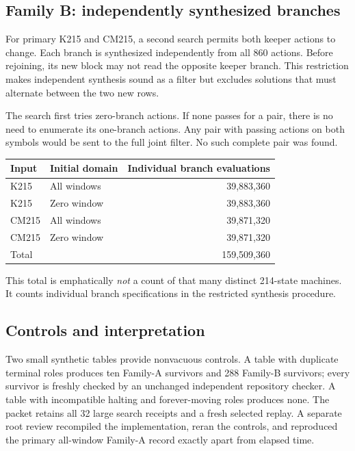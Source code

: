 \documentclass[11pt,letterpaper]{article}
\theoremstyle{definition}
\begin{document}
\subsection{Family B: independently synthesized branches}

For primary K215 and CM215, a second search permits both keeper actions
to change. Each branch is synthesized independently from all 860 actions.
Before rejoining, its new block may not read the opposite keeper branch.
This restriction makes independent synthesis sound as a filter but
excludes solutions that must alternate between the two new rows.

The search first tries zero-branch actions. If none passes for a pair,
there is no need to enumerate its one-branch actions. Any pair with
passing actions on both symbols would be sent to the full joint filter.
No such complete pair was found.

\begin{center}
\begin{tabular}{@{}llr@{}}
\toprule
Input & Initial domain & Individual branch evaluations\\
\midrule
K215 & All windows & 39,883,360\\
K215 & Zero window & 39,883,360\\
CM215 & All windows & 39,871,320\\
CM215 & Zero window & 39,871,320\\
\midrule
Total & & 159,509,360\\
\bottomrule
\end{tabular}
\end{center}

This total is emphatically \emph{not} a count of that many distinct
214-state machines. It counts individual branch specifications in the
restricted synthesis procedure.

\subsection{Controls and interpretation}

Two small synthetic tables provide nonvacuous controls. A table with
duplicate terminal roles produces ten Family-A survivors and 288
Family-B survivors; every survivor is freshly checked by an unchanged
independent repository checker. A table with incompatible halting and
forever-moving roles produces none. The packet retains all 32 large
search receipts and a fresh selected replay. A separate root review
recompiled the implementation, reran the controls, and reproduced the
primary all-window Family-A record exactly apart from elapsed time.
\end{document}
